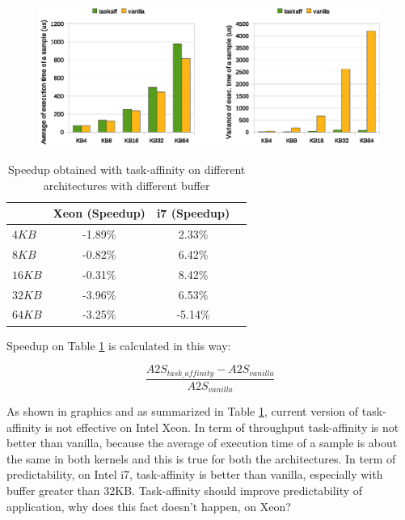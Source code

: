 \newpage

\begin{figure}[htbp]
\centering
\includegraphics[width=\widefigure]{images/time/time_avg_var_i7.eps}
\caption{}
\label{fig:avg_var_i7}
\end{figure}

\begin{table}[htbp]
\begin{center}
\begin{tabular}{l|c|c|c}
	\hline
	& Xeon (Speedup) & i7 (Speedup) \\ \hline
	$4KB$  & -1.89\% & 2.33\% \\ \hline
	$8KB$  & -0.82\% & 6.42\% \\ \hline
	$16KB$ & -0.31\% & 8.42\% \\ \hline
	$32KB$ & -3.96\% & 6.53\% \\ \hline
	$64KB$ & -3.25\% & -5.14\% \\ \hline
\end{tabular}
\caption{Speedup obtained with task-affinity on different architectures with different buffer}
\label{tab:speedup_xeon_i7}
\end{center}
\end{table}

Speedup on Table \ref{tab:speedup_xeon_i7} is calculated in this way:

\begin{equation}
        \frac{A2S_{task\_affinity} - A2S_{vanilla}}{A2S_{vanilla}}
\label{eq:miss_rate}
\end{equation}

As shown in graphics and as summarized in Table \ref{tab:speedup_xeon_i7}, current version of task-affinity is not effective on Intel Xeon.
In term of throughput task-affinity is not better than vanilla, because the average of execution time of a sample is about the same in both kernels and this
is true for both the architectures. In term of predictability, on Intel i7, task-affinity is better than vanilla, especially with buffer greater than 32KB.
Task-affinity should improve predictability of application, why does this fact doesn't happen, on Xeon?

